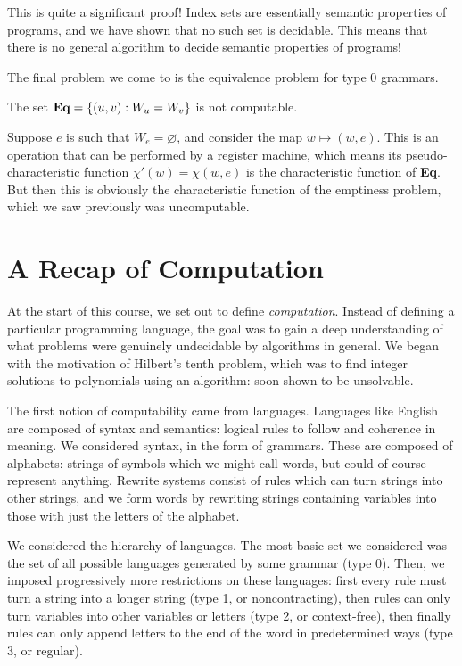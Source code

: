 \documentclass{article}
\begin{document}
This is quite a significant proof! Index sets are essentially semantic properties of programs, and we have shown that no such set is decidable. This means that there is no general algorithm to decide semantic properties of programs!

The final problem we come to is the equivalence problem for type 0 grammars.

\begin{corollary}
	The set $\textbf{Eq} = \left\lbrace (u, v): W_u = W_v \right\rbrace$ is not computable.
\end{corollary}

\begin{prf}
	Suppose $e$ is such that $W_e = \varnothing$, and consider the map $w \mapsto (w, e)$. This is an operation that can be performed by a register machine, which means its pseudo-characteristic function $\chi'(w) = \chi(w, e)$ is the characteristic function of \textbf{Eq}. But then this is obviously the characteristic function of the emptiness problem, which we saw previously was uncomputable.
\end{prf}

\pagebreak
\section{A Recap of Computation}

At the start of this course, we set out to define \textit{computation}. Instead of defining a particular programming language, the goal was to gain a deep understanding of what problems were genuinely undecidable by algorithms in general. We began with the motivation of Hilbert's tenth problem, which was to find integer solutions to polynomials using an algorithm: soon shown to be unsolvable.

The first notion of computability came from {languages}. Languages like English are composed of syntax and semantics: logical rules to follow and coherence in meaning. We considered syntax, in the form of {grammars}. These are composed of {alphabets}: strings of symbols which we might call words, but could of course represent anything. {Rewrite systems} consist of rules which can turn strings into other strings, and we form words by rewriting strings containing variables into those with just the letters of the alphabet.

We considered the hierarchy of languages. The most basic set we considered was the set of all possible languages generated by some grammar (type 0). Then, we imposed progressively more restrictions on these languages: first every rule must turn a string into a longer string (type 1, or noncontracting), then rules can only turn variables into other variables or letters (type 2, or context-free), then finally rules can only append letters to the end of the word in predetermined ways (type 3, or regular).
\end{document}

